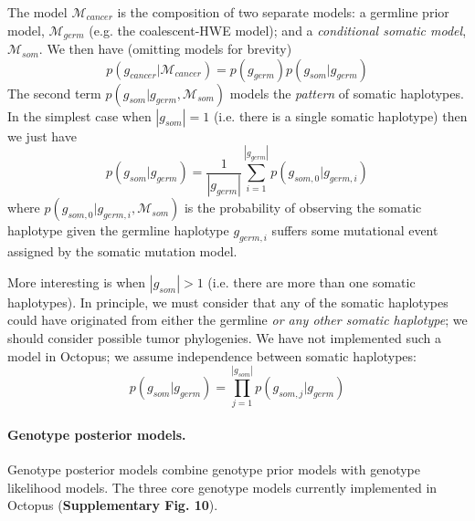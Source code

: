 \documentclass[notitlepage, twocolumn, 10pt]{article}
\begin{document}
The model $\mathcal{M}_{cancer}$ is the composition of two separate models: a germline prior model, $\mathcal{M}_{germ}$ (e.g. the coalescent-HWE model); and a \emph{conditional somatic model}, $\mathcal{M}_{som}$. We then have (omitting models for brevity)
\begin{equation*}
 p(g_{cancer} | \mathcal{M}_{cancer}) = p(g_{germ}) p(g_{som} | g_{germ})
\end{equation*}
The second term $p(g_{som} | g_{germ}, \mathcal{M}_{som})$ models the \emph{pattern} of somatic haplotypes. In the simplest case when $|g_{som}| = 1$ (i.e. there is a single somatic haplotype) then we just have
\begin{equation*}
	p(g_{som} | g_{germ}) = \frac{1}{|g_{germ}|} \sum_{i = 1}^{|g_{germ}|} p(g_{som,0} | g_{germ, i})
\end{equation*}
where $p(g_{som,0} | g_{germ, i}, \mathcal{M}_{som})$ is the probability of observing the somatic haplotype given the germline haplotype $g_{germ, i}$ suffers some mutational event assigned by the somatic mutation model.

More interesting is when $|g_{som}| > 1$ (i.e. there are more than one somatic haplotypes). In principle, we must consider that any of the somatic haplotypes could have originated from either the germline \emph{or any other somatic haplotype}; we should consider possible tumor phylogenies. We have not implemented such a model in Octopus; we assume independence between somatic haplotypes:
\begin{equation*}
p(g_{som} | g_{germ}) = \prod_{j = 1}^{|g_{som}|} p(g_{som,j} | g_{germ})
\end{equation*}

\paragraph*{Genotype posterior models.} Genotype posterior models combine genotype prior models with genotype likelihood models. The three core genotype models currently implemented in Octopus (\textbf{Supplementary Fig. 10}).
\end{document}
